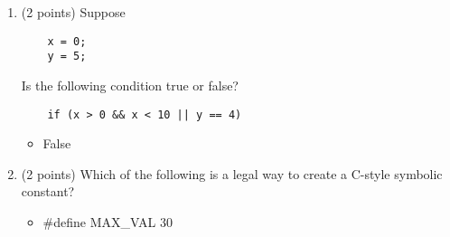 \documentclass{report}
\begin{document}
\begin{enumerate}
    \item (2 points) Suppose
    \begin{verbatim}
    x = 0;
    y = 5;
    \end{verbatim}
    Is the following condition true or false?
    \begin{verbatim}
    if (x > 0 && x < 10 || y == 4)
    \end{verbatim}
    \begin{itemize}
        \item False
    \end{itemize}
    
    \item (2 points) Which of the following is a legal way to create a C-style symbolic constant?
    \begin{itemize}
        \item \#define MAX\_VAL 30
    \end{itemize}
    \end{enumerate}




    
\end{document}
